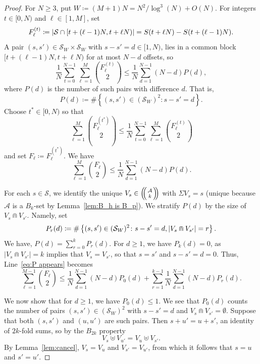 \documentclass[10pt,a4paper]{amsart}
\DeclarePairedDelimiter{\abs}{\lvert}{\rvert}
\newcommand{\cA}{\mathcal{A}}
\newcommand{\cS}{\mathcal{S}}
\newcommand{\multibinom}[2]{\left(\kern-0.3em\left(\genfrac{}{}{0pt}{}{#1}{#2}\right)\kern-0.3em\right)}
\begin{document}
\begin{proof}
For $N\ge 3$, put $W\coloneqq (M+1)N=N^2/\log^3(N)+O(N)$.  For integers
$t\in[0,N)$ and $\ell \in [1,M]$, set
  \[F_\ell^{(t)}\coloneqq \abs*{\cS \cap [t+(\ell-1)N, t+\ell N)}
  =S(t+\ell N)-S(t+(\ell-1)N).\]  
A pair $(s,s') \in \cS_W\times \cS_W$ with $s-s'=d \in[1, N)$, lies in a common block $[t+(\ell-1)N, t+\ell N)$ for at most $N-d$ offsets, so
\begin{equation}\label{eq:average}
   \frac1N\sum_{t=0}^{N-1}\sum_{\ell=1}^{M}\binom{F_\ell^{(t)}}{2}
    \le \frac1N\sum_{d=1}^{N-1}(N-d) P(d),
\end{equation}
where $P(d)$ is the number of such pairs with difference $d$.  
That is,
  \[P(d) \coloneqq \#\left\{ (s,s') \in (\cS_W)^2 \colon s-s'=d \right\}.\]
Choose $t^\ast\in[0,N)$ so that
  \[\sum_{\ell=1}^{M}\binom{F_\ell^{(t^\ast)}}{2} \le \frac1N\sum_{t=0}^{N-1}\sum_{\ell=1}^{M}\binom{F_\ell^{(t)}}{2}\]
and set $F_\ell \coloneqq F_\ell^{(t^\ast)}$. We have
  \begin{equation}\label{eq:P appears}
    \sum_{\ell=1}^{M}\binom{F_\ell}{2}
    \le \frac1N\sum_{d=1}^{N-1}(N-d) P(d).
  \end{equation}

For each $s\in \cS$, we identify the unique $V_s \in \multibinom{\cA}{k}$ with $\Sigma V_s =s $ (unique because $\cA$ is a $B_k$-set by Lemma~\ref{lem:B_h is B_p}). 
We stratify $P(d)$ by the size of $V_s \Cap V_{s'}$. Namely, set
  \[P_r(d) \coloneqq \#\left\{ (s,s')\in (\cS_W)^2 \colon s-s'=d ,\abs*{V_s \Cap V_{s'}}=r \right\}.\]
We have, $P(d) = \sum_{r=0}^k P_r(d)$. For $d\ge1$, we have $P_k(d)=0$, as $|V_s \Cap V_{s'}| =k$ implies that $V_s=V_{s'}$, so that $s=s'$ and $s-s'=d=0$. 
Thus, Line~\eqref{eq:P appears} becomes
  \begin{equation}\label{eq:P_r appears}
    \sum_{\ell=1}^{M-1}\binom{F_\ell}{2}
    \le \frac1N\sum_{d=1}^{N-1}(N-d) P_0(d)+ \sum_{r=1}^{k-1} \frac1N\sum_{d=1}^{N-1}(N-d) P_r(d).
  \end{equation}

We now show that for $d\ge 1$, we have $P_0(d)\le 1$. 
We see that $P_0(d)$ counts the number of pairs $(s,s')\in (\cS_W)^2$ with $s-s'=d$ and $V_s \Cap V_{s'}=\emptyset$.
Suppose that both $(s,s')$ and $(u,u')$ are such pairs. 
Then $s+u'=u+s'$, an identity of $2k$-fold sums, so by the $B_{2k}$ property
  \[V_s \uplus V_{u'} = V_{u} \uplus V_{s'}.\]
By Lemma~\ref{lem:cancel}, $V_s=V_u$ and $V_{s'}=V_{u'}$, from which it follows that $s=u$ and $s'=u'$. 


\end{proof}
\end{document}
